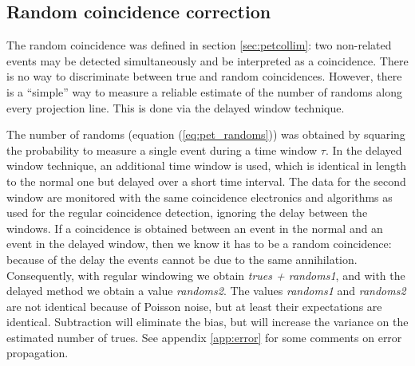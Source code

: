 \subsection{Random coincidence correction \label{sec:randoms}}
The random coincidence was defined in section \ref{sec:petcollim}: two
non-related events may be detected simultaneously and be interpreted as a
coincidence. There is no way to discriminate between true and random
coincidences. However, there is a ``simple'' way to measure a reliable
estimate of the number of randoms along every projection line. This is done
via the delayed window technique.

The number of randoms (equation (\ref{eq:pet_randoms})) was obtained by
squaring the probability to measure a single event during a time window
$\tau$. In the delayed window technique, an additional time window is used,
which is identical in length to the normal one but delayed over a short time
interval. The data for the second window are monitored with the same
coincidence electronics and algorithms as used for the regular coincidence
detection, ignoring the delay between the windows. If a coincidence is
obtained between an event in the normal and an event in the delayed window,
then we know it has to be a random coincidence: because of the delay the
events cannot be due to the same annihilation. Consequently, with regular
windowing we obtain {\em trues + randoms1}, and with the delayed method we
obtain a value {\em randoms2}. The values {\em randoms1} and {\em randoms2}
are not identical because of Poisson noise, but at least their expectations
are identical. Subtraction will eliminate the bias, but will increase the
variance on the estimated number of trues. See appendix \ref{app:error} for
some comments on error propagation.
